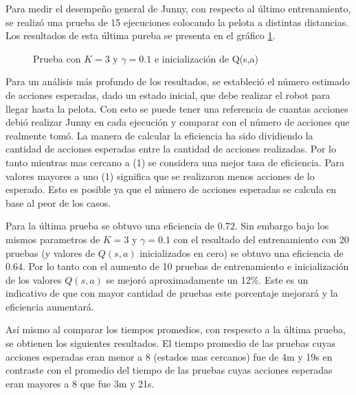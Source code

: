 Para medir el desempeño general de Junny, con respecto al último entrenamiento, se realizó una prueba de 15 ejecuciones colocando la pelota a distintas distancias. Los resultados de esta \'ultima pureba se presenta en el gr\'afico \ref{fig:mejor}. 

\begin{figure}[h]
\caption{Prueba con $K = 3$ y $ \gamma = 0.1 $ e inicializaci\'on de Q(s,a)}
\label{fig:mejor}
\end{figure} 

Para un análisis más profundo de los resultados, se estableci\'o el n\'umero estimado de acciones esperadas, dado un estado inicial, que debe realizar el robot para llegar hasta la pelota. Con esto se puede tener una referencia de cuantas acciones debió realizar Junny en cada ejecución y comparar con el número de acciones que realmente tomó. La manera de calcular la eficiencia ha sido dividiendo la cantidad de acciones esperadas entre la cantidad de acciones realizadas. Por lo tanto mientras mas cercano a (1) se considera una mejor tasa de eficiencia. Para valores mayores a uno (1) significa que se realizaron menos acciones de lo esperado. Esto es posible ya que el número de acciones esperadas se calcula en base al peor de los casos.  

Para la última prueba se obtuvo una eficiencia de $0.72$. Sin embargo bajo los mismos parametros de $K = 3$ y $ \gamma = 0.1 $ con el resultado del entrenamiento con 20 pruebas (y valores de $Q(s,a)$ inicializados en cero) se obtuvo una eficiencia de $0.64$. Por lo tanto con el aumento de 10 pruebas de entrenamiento e inicialización de los valores $Q(s,a)$ se mejoró aproximadamente un 12\%. Este es un indicativo de que con mayor cantidad de pruebas este porcentaje mejorar\'a y la eficiencia aumentará.

Así mismo al comparar los tiempos promedios, con respescto a la última prueba, se obtienen los siguientes resultados. El tiempo promedio de las pruebas cuyas acciones esperadas eran menor a 8 (estados mas cercanos) fue de 4m y 19s en contraste con el promedio del tiempo de las pruebas cuyas acciones esperadas eran mayores a 8 que fue 3m y 21s.

 

   

